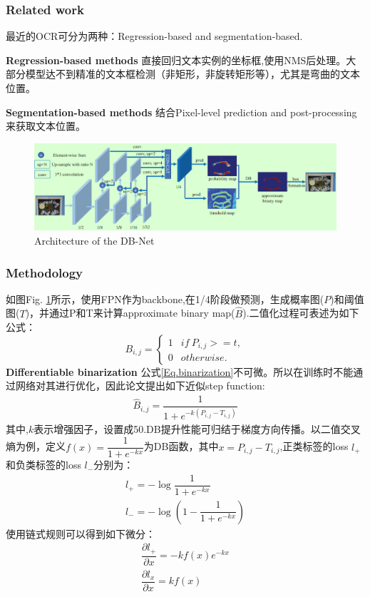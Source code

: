 \documentclass{article}
\begin{document}
\subsubsection{Related work}
最近的OCR可分为两种：Regression-based and segmentation-based.

\textbf{Regression-based methods} 直接回归文本实例的坐标框,使用NMS后处理。大部分模型达不到精准的文本框检测（非矩形，非旋转矩形等），尤其是弯曲的文本位置。

\textbf{Segmentation-based methods} 结合Pixel-level prediction and post-processing 来获取文本位置。
\begin{figure}[htp!]
\centering
\includegraphics[scale=0.4]{images/dbnet.png}
\caption{Architecture of the DB-Net}
\label{Fig.dbnet}
\end{figure}

\subsubsection{Methodology}
如图Fig. \ref{Fig.dbnet}所示，使用FPN作为backbone,在1/4阶段做预测，生成概率图($P$)和阈值图($T$)，并通过P和T来计算approximate binary map($\hat{B}$).二值化过程可表述为如下公式：
\begin{equation}
B_{i,j} = \left\{
\begin{array}{lr}
1 & if \: P_{i,j} >=t, \\
0 & otherwise.
\end{array}
\right.
\label{Eq.binarization}
\end{equation}
\textbf{Differentiable binarization} 公式\ref{Eq.binarization}不可微。所以在训练时不能通过网络对其进行优化，因此论文提出如下近似step function:
\begin{align}
\hat{B}_{i,j}=\dfrac{1}{1+e^{-k(P_{i,j}-T_{i,j})}}
\end{align}
其中,$k$表示增强因子，设置成50.DB提升性能可归结于梯度方向传播。以二值交叉熵为例，定义$f(x)=\dfrac{1}{1+e^{-kx}}$为DB函数，其中$x=P_{i,j}-T_{i,j}$,正类标签的loss $l_+$和负类标签的loss $l_-$分别为：
\begin{equation}
\begin{aligned}
l_+ = -\log{\dfrac{1}{1+e^{-kx}}} \\
l_- = -\log{(1-\dfrac{1}{1+e^{-kx}})}
\end{aligned}
\end{equation}
使用链式规则可以得到如下微分：
\begin{align}
\dfrac{\partial l_+}{\partial x} = -kf(x)e^{-kx} \\
\dfrac{\partial l_x}{\partial x} = kf(x)
\end{align}
\end{document}
